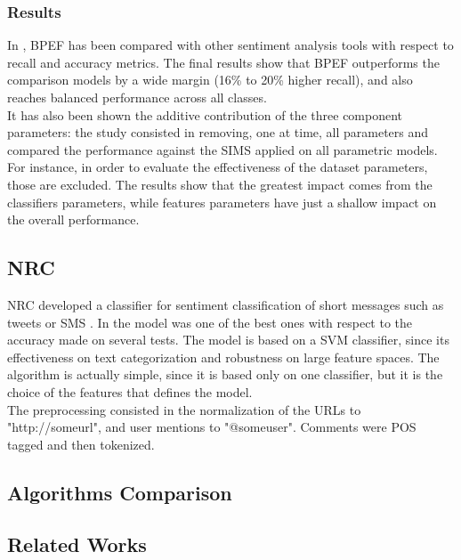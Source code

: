 \subsubsection{Results}

In \cite{Hassan2013TwitterSA}, \ac{BPEF} has been compared with other sentiment analysis tools with respect to recall and accuracy metrics. The final results show that \ac{BPEF} outperforms the comparison models by a wide margin (16\% to 20\% higher recall), and also reaches balanced performance across all classes.\\
It has also been shown the additive contribution of the three component parameters: the study consisted in removing, one at time, all parameters and compared the performance against the SIMS applied on all parametric models. For instance, in order to evaluate the effectiveness of the dataset parameters, those are excluded. The results show that the greatest impact comes from the classifiers parameters, while features parameters have just a shallow impact on the overall performance.

\subsection{NRC}

\ac{NRC} developed a classifier for sentiment classification of short messages such as tweets or SMS \cite{DBLP:journals/corr/MohammadKZ13}. In \cite{Zimbra:2018:STS:3210372.3185045} the model was one of the best ones with respect to the accuracy made on several tests. The model is based on a \ac{SVM} classifier, since its effectiveness on text categorization and robustness on large feature spaces. The algorithm is actually simple, since it is based only on one classifier, but it is the choice of the features that defines the model.\\
The preprocessing consisted in the normalization of the URLs to "http://someurl", and user mentions to "@someuser". Comments were \ac{POS} tagged and then tokenized.


\subsection{Algorithms Comparison}






\subsection{Related Works}

